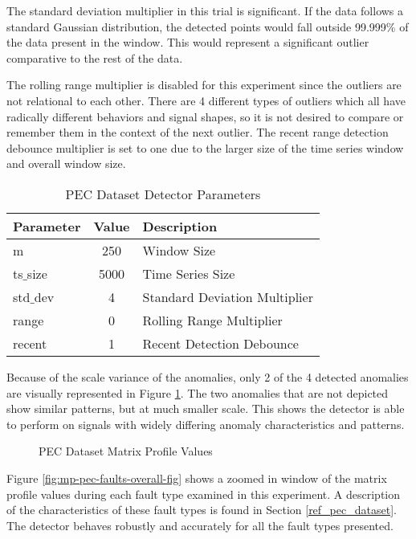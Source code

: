 The standard deviation multiplier in this trial is significant.
If the data follows a standard Gaussian distribution, the detected points would fall outside 99.999\% of the data present in the window.
This would represent a significant outlier comparative to the rest of the data.

The rolling range multiplier is disabled for this experiment since the outliers are not relational to each other.
There are 4 different types of outliers which all have radically different behaviors and signal shapes, so it is not desired to compare or remember them in the context of the next outlier.
The recent range detection debounce multiplier is set to one due to the larger size of the time series window and overall window size.

\begin{table}[H]
\caption{PEC Dataset Detector Parameters}
\begin{tabular}{|l|c|l|}
    \hline
	\textbf{Parameter} & \textbf{Value} & \textbf{Description} \\ \hline
	m & 250 & Window Size \\ \hline
	ts$\_$size & 5000 & Time Series Size \\ \hline
	std$\_$dev & 4 & Standard Deviation Multiplier \\ \hline
	range & 0 & Rolling Range Multiplier\\ \hline
	recent & 1 & Recent Detection Debounce\\ \hline
\end{tabular}
\label{tab:pec_sim_params}
\end{table}

Because of the scale variance of the anomalies, only 2 of the 4 detected anomalies are visually represented in Figure \ref{fig:pec_mp_hist}. The two anomalies that are not depicted show similar patterns, but at much smaller scale. This shows the detector is able to perform on signals with widely differing anomaly characteristics and patterns.

\begin{figure}[H]
    
    \caption{PEC Dataset Matrix Profile Values}
    \label{fig:pec_mp_hist}
\end{figure}

Figure \ref{fig:mp-pec-faults-overall-fig} shows a zoomed in window of the matrix profile values during each fault type examined in this experiment.
A description of the characteristics of these fault types is found in Section \ref{ref_pec_dataset}.
The detector behaves robustly and accurately for all the fault types presented.

